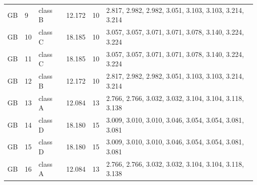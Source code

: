 \begin{longtable}{llllcl}
GB & 9 & class B & 12.172 & 10 & 2.817, 2.982, 2.982, 3.051, 3.103, 3.103, 3.214, 3.214 \\
GB & 10 & class C & 18.185 & 10 & 3.057, 3.057, 3.071, 3.071, 3.078, 3.140, 3.224, 3.224 \\
GB & 11 & class C & 18.185 & 10 & 3.057, 3.057, 3.071, 3.071, 3.078, 3.140, 3.224, 3.224 \\
GB & 12 & class B & 12.172 & 10 & 2.817, 2.982, 2.982, 3.051, 3.103, 3.103, 3.214, 3.214 \\
GB & 13 & class A & 12.084 & 13 & 2.766, 2.766, 3.032, 3.032, 3.104, 3.104, 3.118, 3.138 \\
GB & 14 & class D & 18.180 & 15 & 3.009, 3.010, 3.010, 3.046, 3.054, 3.054, 3.081, 3.081 \\
GB & 15 & class D & 18.180 & 15 & 3.009, 3.010, 3.010, 3.046, 3.054, 3.054, 3.081, 3.081 \\
GB & 16 & class A & 12.084 & 13 & 2.766, 2.766, 3.032, 3.032, 3.104, 3.104, 3.118, 3.138 \\
\bottomrule
\end{longtable}